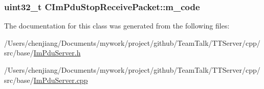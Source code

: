 \subsubsection[{m\+\_\+code}]{\setlength{\rightskip}{0pt plus 5cm}uint32\+\_\+t C\+Im\+Pdu\+Stop\+Receive\+Packet\+::m\+\_\+code\hspace{0.3cm}{\ttfamily [private]}}\label{class_c_im_pdu_stop_receive_packet_a8d20d5a67b28f487e30c7ffb1d796265}


The documentation for this class was generated from the following files\+:\begin{DoxyCompactItemize}
\item 
/\+Users/chenjiang/\+Documents/mywork/project/github/\+Team\+Talk/\+T\+T\+Server/cpp/src/base/\hyperlink{_im_pdu_server_8h}{Im\+Pdu\+Server.\+h}\item 
/\+Users/chenjiang/\+Documents/mywork/project/github/\+Team\+Talk/\+T\+T\+Server/cpp/src/base/\hyperlink{_im_pdu_server_8cpp}{Im\+Pdu\+Server.\+cpp}\end{DoxyCompactItemize}
